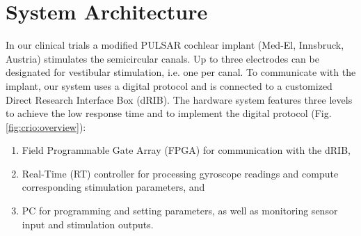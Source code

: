 \section{System Architecture}
In our clinical trials a modified PULSAR cochlear implant (Med-El, Innsbruck, Austria) stimulates the semicircular canals. Up to three electrodes can be designated for vestibular stimulation, i.e. one per canal. To communicate with the implant, our system uses a digital protocol and is connected to a customized Direct Research Interface Box (dRIB). The hardware system features three levels to achieve the low response time and to implement the digital protocol (Fig.\,\ref{fig:crio:overview}):
\begin{enumerate}
\item Field Programmable Gate Array (FPGA) for communication with the dRIB,
\item Real-Time (RT) controller for processing gyroscope readings and compute corresponding stimulation parameters, and
\item PC for programming and setting parameters, as well as monitoring sensor input and stimulation outputs.
\end{enumerate}

